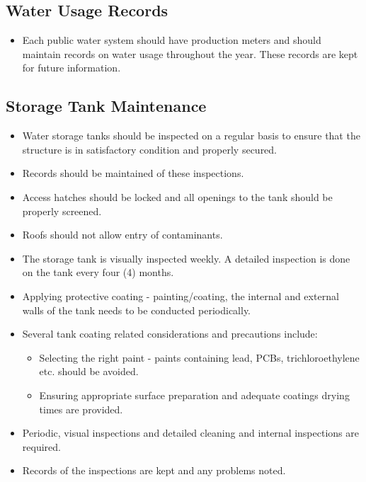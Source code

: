 \subsection{Water Usage Records} 
\begin{itemize}
\item Each public water system should have production meters and should maintain records on water usage throughout the year. These records are kept for future information.
\end{itemize}

\subsection{Storage Tank Maintenance} 
\begin{itemize}
\item Water storage tanks should be inspected on a regular basis to ensure that the structure is in satisfactory condition and properly secured. 
\item Records should be maintained of these inspections.  
\item Access hatches should be locked and all openings to the tank should be properly screened.  \item Roofs should not allow entry of contaminants.
\item The storage tank is visually inspected weekly.  A detailed inspection is done on the tank every four (4) months.  
\item Applying protective coating - painting/coating, the internal and external walls of the tank needs to be conducted periodically.
\item Several tank coating related considerations and precautions include: 
\begin{itemize}
\item Selecting the right paint - paints containing lead, PCBs, trichloroethylene etc. should be avoided.
\item  Ensuring appropriate surface preparation and adequate coatings drying times are provided.
\end{itemize}
\item Periodic, visual inspections and detailed cleaning and internal inspections are required. 

\item Records of the inspections are kept and any problems noted.
\end{itemize}

